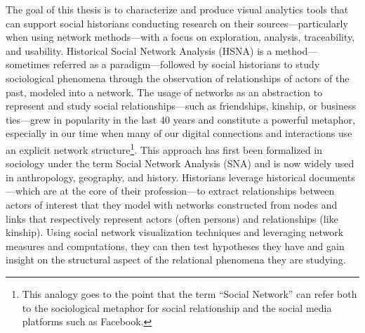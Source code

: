 The goal of this thesis is to characterize and produce visual analytics tools that can support social historians conducting research on their sources---particularly when using network methods---with a focus on exploration, analysis, traceability, and usability.
Historical Social Network Analysis (HSNA) is a method---sometimes referred as a paradigm\cite{whiteNetworkAnalysisEthnographic2005}---followed by social historians to study sociological phenomena through the observation of relationships of actors of the past, modeled into a network.
The usage of networks as an abstraction to represent and study social relationships---such as friendships, kinship, or business ties---grew in popularity in the last 40 years \cite{freemanDevelopmentSocialNetwork2004, tabassumSocialNetworkAnalysis2018} and constitute a powerful metaphor, especially in our time when many of our digital connections and interactions use an explicit network structure\footnote{This analogy goes to the point that the term ``Social Network'' can refer both to the sociological metaphor for social relationship and the social media platforms such as Facebook.}.
This approach has first been formalized in sociology under the term Social Network Analysis (SNA)\cite{freemanDevelopmentSocialNetwork2004} and is now widely used in anthropology, geography, and history\cite{kerschbaumerPowerNetworksProspects2015}.
Historians leverage historical documents---which are at the core of their profession\cite{langloisIntroductionAuxEtudes2014}---to extract relationships between actors of interest that they model with networks constructed from nodes and links that respectively represent actors (often persons) and relationships (like kinship).
Using social network visualization techniques and leveraging network measures and computations, they can then test hypotheses they have and gain insight on the structural aspect of the relational phenomena they are studying\cite{wetherellHistoricalSocialNetwork1998, kerschbaumerPowerNetworksProspects2015}.
